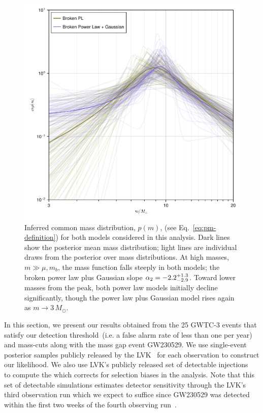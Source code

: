 \documentclass[modern]{aastex631}
\begin{document}
\begin{figure}
    \includegraphics[width=\columnwidth]{figures/pm_traces_including_230529.pdf}
    \caption{\label{fig:pm-traces_including_230529} Inferred common mass distribution, $p(m)$,
    (see Eq.~\eqref{eq:pm-definition}) for both models considered in this
    analysis.  Dark lines show the posterior mean mass distribution; light lines
    are individual draws from the posterior over mass distributions.  At high
    masses, $m \gg \mu, m_b$, the mass function falls steeply in both models;
    the broken power law plus Gaussian slope $\alpha_2 = -2.2^{+1.3}_{-2.9}$.
    Toward lower masses from the peak, both power law models initially decline
    significantly, though the power law plus Gaussian model rises again as $m
    \to 3 \, M_\odot$.}
\end{figure}

In this section, we present our results obtained from the 25 GWTC-3 events that
satisfy our detection threshold~(i.e. a false alarm rate of less than one per
year) and mass-cuts along with the mass gap event GW230529. We use single-event
posterior samples publicly released by the LVK~\citep{gwosco3, gwosco4} for each
observation to construct our likelihood. We also use LVK's publicly released set
of detectable injections~\citep{gwosco3} to compute the
 which corrects for selection biases in the
analysis. Note that this set of detectable simulations estimates detector
sensitivity through the LVK's third observation run
which we expect to suffice since GW230529 was detected within the first two
weeks of the fourth observing run~\citep{LIGOScientific:2024elc}.
\end{document}
